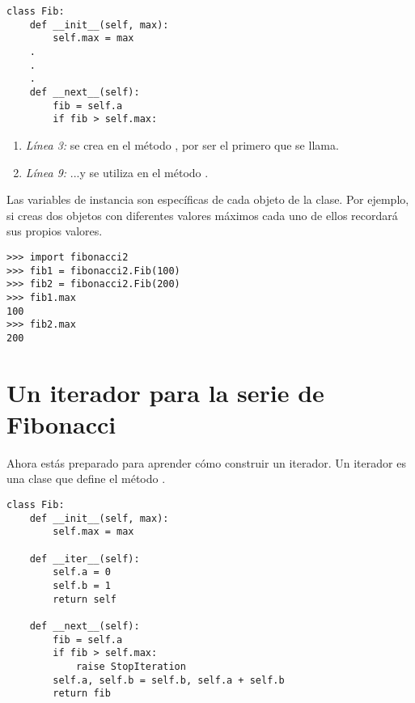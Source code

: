 \noindent\begin{minipage}{\textwidth}
\begin{lstlisting}[mathescape=True]
class Fib:
    def __init__(self, max):
        self.max = max
    .
    .
    .
    def __next__(self):
        fib = self.a
        if fib > self.max:
\end{lstlisting}
\end{minipage}

\begin{enumerate}

\item \emph{Línea 3:}  se crea en el método , por ser el primero que se llama.

\item \emph{Línea 9:} ...y se utiliza en el método . 

\end{enumerate}

Las variables de instancia son específicas de cada objeto de la clase. Por ejemplo, si creas dos objetos  con diferentes valores máximos cada uno de ellos recordará sus propios valores.

\noindent\begin{minipage}{\textwidth}
\begin{lstlisting}[mathescape=True]
>>> import fibonacci2
>>> fib1 = fibonacci2.Fib(100)
>>> fib2 = fibonacci2.Fib(200)
>>> fib1.max
100
>>> fib2.max
200
\end{lstlisting}
\end{minipage}

\section{Un iterador para la serie de Fibonacci}

Ahora estás preparado para aprender cómo construir un iterador. Un iterador es una clase que define el método .


\noindent\begin{minipage}{\textwidth}
\begin{lstlisting}[mathescape=True]
class Fib:                 
    def __init__(self, max):
        self.max = max

    def __iter__(self):   
        self.a = 0
        self.b = 1
        return self

    def __next__(self):  
        fib = self.a
        if fib > self.max:
            raise StopIteration
        self.a, self.b = self.b, self.a + self.b
        return fib            
\end{lstlisting}
\end{minipage}

